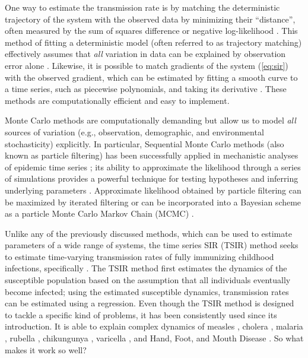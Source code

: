 \documentclass{article}
\newcommand{\eref}[1]{(\ref{eq:#1})}
\begin{document}
One way to estimate the transmission rate is by matching the deterministic trajectory of the system with the observed data by minimizing their ``distance'', often measured by the sum of squares difference or negative log-likelihood \citep{riley2003transmission, chowell2004basic}.
This method of fitting a deterministic model (often referred to as trajectory matching) effectively assumes that \emph{all} variation in data can be explained by observation error alone \citep{bolker2008ecological}.
Likewise, it is possible to match gradients of the system \eref{sir} with the observed gradient, which can be estimated by fitting a smooth curve to a time series, such as piecewise polynomials, and taking its derivative \citep{ellner2002fitting}.
These methods are computationally efficient and easy to implement.

Monte Carlo methods are computationally demanding but allow us to model \emph{all} sources of variation (e.g., observation, demographic, and environmental stochasticity) explicitly.
In particular, Sequential Monte Carlo methods (also known as particle filtering) has been successfully applied in mechanistic analyses of epidemic time series \citep{ionides2006inference, breto2009time, he2009plug, he2011mechanistic, didelot2017model}; its ability to approximate the likelihood through a series of simulations provides a powerful technique for testing hypotheses and inferring underlying parameters \citep{ionides2006inference, breto2009time, king2015statistical}.
Approximate likelihood obtained by particle filtering can be maximized by iterated filtering \citep{ionides2011iterated, ionides2015inference} or can be incorporated into a Bayesian scheme as a particle Monte Carlo Markov Chain (MCMC) \citep{andrieu2010particle}.

Unlike any of the previously discussed methods, which can be used to estimate parameters of a wide range of systems, the time series SIR (TSIR) method seeks to estimate time-varying transmission rates of fully immunizing childhood infections, specifically \citep{finkenstadt2000time}.
The TSIR method first estimates the dynamics of the susceptible population based on the assumption that all individuals eventually become infected;
using the estimated susceptible dynamics, transmission rates can be estimated using a regression. 
Even though the TSIR method is designed to tackle a specific kind of problems, it has been consistently used since its introduction.
It is able to explain complex dynamics of measles \citep{finkenstadt2000time, bjornstad2002dynamics, grenfell2002dynamics, finkenstadt2002stochastic, metcalf2009seasonality, mantilla2009decreasing, ferrari2010rural, dalziel2016persistent, mahmud2017drivers}, 
cholera \citep{koelle2004disentangling, pascual2008predicting}, 
malaria \citep{pascual2007shifting}, 
rubella \citep{metcalf2010rubella,metcalf2011epidemiology, metcalf2013implications}, 
chikungunya \citep{perkins2015estimating}, 
varicella \citep{jackson2014effects, baker2018dynamic}, 
and Hand, Foot, and Mouth Disease \citep{takahashi2016hand, van2016hand, du2017estimating, takahashi2018epidemic}.
So what makes it work so well?
\end{document}

